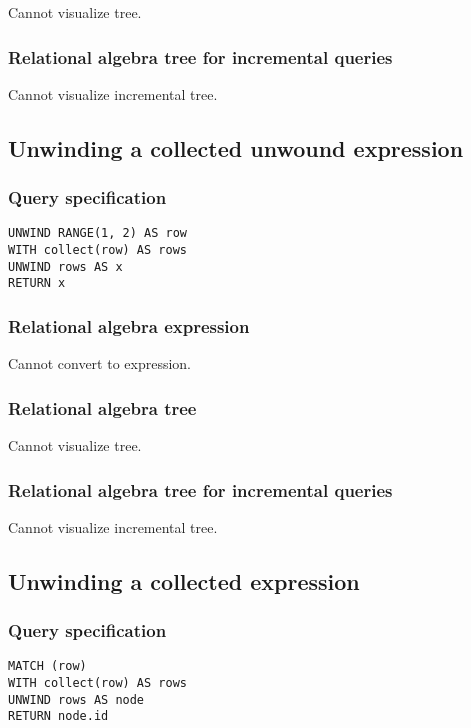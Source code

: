 Cannot visualize tree.

\subsubsection*{Relational algebra tree for incremental queries}

Cannot visualize incremental tree.

\subsection{Unwinding a collected unwound expression}

\subsubsection*{Query specification}

\begin{lstlisting}
UNWIND RANGE(1, 2) AS row
WITH collect(row) AS rows
UNWIND rows AS x
RETURN x
\end{lstlisting}

\subsubsection*{Relational algebra expression}

Cannot convert to expression.

\subsubsection*{Relational algebra tree}

Cannot visualize tree.

\subsubsection*{Relational algebra tree for incremental queries}

Cannot visualize incremental tree.

\subsection{Unwinding a collected expression}

\subsubsection*{Query specification}

\begin{lstlisting}
MATCH (row)
WITH collect(row) AS rows
UNWIND rows AS node
RETURN node.id
\end{lstlisting}

